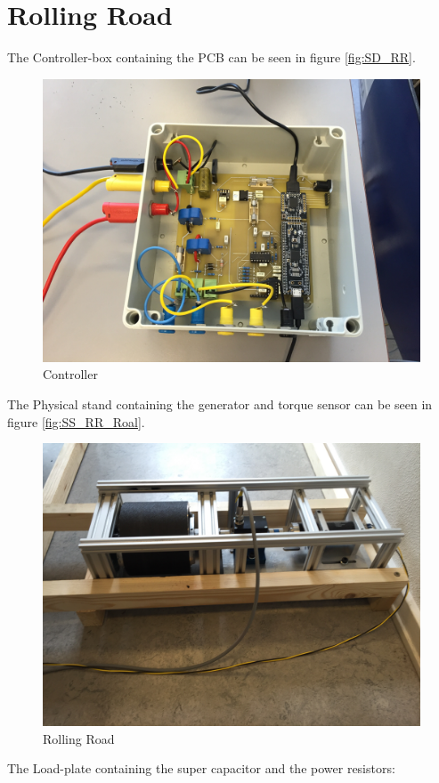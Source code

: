\section{Rolling Road}
The Controller-box containing the PCB can be seen in figure \vref{fig:SD_RR}.

\begin{figure}[h!]
\centering
\includegraphics[width=0.7\linewidth]{SubPages/Images/SD_RR}
\caption{Controller}
\label{fig:SD_RR}
\end{figure}


The Physical stand containing the generator and torque sensor can be seen in figure \vref{fig:SS_RR_Roal}.

\begin{figure}[h!]
\centering
\includegraphics[width=0.7\linewidth]{SubPages/Images/SS_RR_Roal}
\caption{Rolling Road}
\label{fig:SS_RR_Roal}
\end{figure}


The Load-plate containing the super capacitor and the power resistors:

